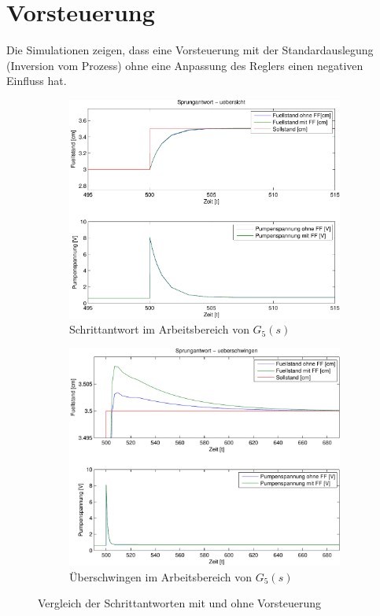 \section{Vorsteuerung}
Die Simulationen zeigen, dass eine Vorsteuerung mit der Standardauslegung
(Inversion vom Prozess) ohne eine Anpassung des Reglers einen negativen
Einfluss hat.

\begin{figure}[h!]
    \centering
    \begin{subfigure}{0.475\textwidth}
        \includegraphics[width=1.\textwidth]{13/L5_step_overview_plot.pdf}
        \caption{Schrittantwort im Arbeitsbereich von $G_5(s)$}
    \end{subfigure}
    \hfill{}
    \begin{subfigure}{0.475\textwidth}
        \includegraphics[width=1.\textwidth]{13/L5_step_overshoot_plot.pdf}
        \caption{Überschwingen im Arbeitsbereich von $G_5(s)$}
    \end{subfigure}
    \caption{Vergleich der Schrittantworten mit und ohne Vorsteuerung}
\end{figure}

